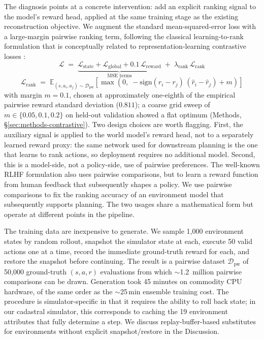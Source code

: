 \documentclass[11pt]{article}
\begin{document}
The diagnosis points at a concrete intervention: add an explicit ranking signal to the model's reward head, applied at the same training stage as the existing reconstruction objective. We augment the standard mean-squared-error loss with a large-margin pairwise ranking term, following the classical learning-to-rank formulation \citep{herbrich2000large,joachims2002optimizing,burges2005learning,burges2010ranknet} that is conceptually related to representation-learning contrastive losses \citep{chen2020simple,oord2018representation}:
\begin{equation}
\mathcal{L} \;=\; \underbrace{\mathcal{L}_{\text{state}} + \mathcal{L}_{\text{global}} + 0.1\,\mathcal{L}_{\text{reward}}}_{\text{MSE terms}} \;+\; \lambda_{\text{rank}}\,\mathcal{L}_{\text{rank}}
\end{equation}
\begin{equation}
\mathcal{L}_{\text{rank}} \;=\; \mathbb{E}_{(s,a_i,a_j)\sim\mathcal{D}_{\text{pw}}}\!\left[\max\!\left(0,\; -\mathrm{sign}(r_i - r_j)\,(\hat{r}_i - \hat{r}_j) + m\right)\right]
\end{equation}
with margin $m{=}0.1$, chosen at approximately one-eighth of the empirical pairwise reward standard deviation ($0.811$); a coarse grid sweep of $m \in \{0.05, 0.1, 0.2\}$ on held-out validation showed a flat optimum (Methods, \S\ref{sec:methods-contrastive}). Two design choices are worth flagging. First, the auxiliary signal is applied to the world model's reward head, not to a separately learned reward proxy: the same network used for downstream planning is the one that learns to rank actions, so deployment requires no additional model. Second, this is a model-side, not a policy-side, use of pairwise preferences. The well-known RLHF formulation \citep{christiano2017deep,ouyang2022training} also uses pairwise comparisons, but to learn a reward function from human feedback that subsequently shapes a policy. We use pairwise comparisons to fix the ranking accuracy of an environment model that subsequently supports planning. The two usages share a mathematical form but operate at different points in the pipeline.

The training data are inexpensive to generate. We sample 1{,}000 environment states by random rollout, snapshot the simulator state at each, execute 50 valid actions one at a time, record the immediate ground-truth reward for each, and restore the snapshot before continuing. The result is a pairwise dataset $\mathcal{D}_{\text{pw}}$ of 50{,}000 ground-truth $(s, a, r)$ evaluations from which $\sim$1.2~million pairwise comparisons can be drawn. Generation took 45 minutes on commodity CPU hardware, of the same order as the $\sim$25\,min ensemble training cost. The procedure is simulator-specific in that it requires the ability to roll back state; in our cadastral simulator, this corresponds to caching the 19 environment attributes that fully determine a step. We discuss replay-buffer-based substitutes for environments without explicit snapshot/restore in the Discussion.
\end{document}
